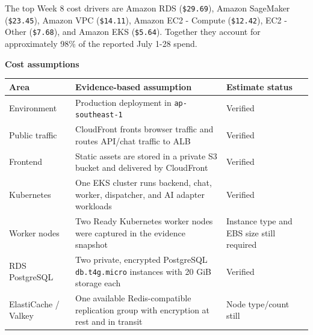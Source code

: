 The top Week 8 cost drivers are Amazon RDS (\texttt{\$29.\allowbreak{}69}), Amazon
SageMaker (\texttt{\$23.\allowbreak{}45}), Amazon VPC (\texttt{\$14.\allowbreak{}11}), Amazon EC2
- Compute (\texttt{\$12.\allowbreak{}42}), EC2 - Other (\texttt{\$7.\allowbreak{}68}), and Amazon
EKS (\texttt{\$5.\allowbreak{}64}). Together they account for approximately 98\% of
the reported July 1-28 spend.

\vspace{0.5em}\noindent\textbf{Cost assumptions}\par

{
\begingroup
\small
\setlength{\tabcolsep}{3pt}
\renewcommand{\arraystretch}{1.15}
\begin{longtable}{@{}
  >{\raggedright\arraybackslash}p{}
  >{\raggedright\arraybackslash}p{}
  >{\raggedright\arraybackslash}p{}@{}}
\toprule\noalign{}
\begin{minipage}[b]{\linewidth}\raggedright
Area
\end{minipage} & \begin{minipage}[b]{\linewidth}\raggedright
Evidence-based assumption
\end{minipage} & \begin{minipage}[b]{\linewidth}\raggedright
Estimate status
\end{minipage} \\
\midrule\noalign{}
\endhead
\bottomrule\noalign{}
\endlastfoot
Environment & Production deployment in \texttt{ap-\allowbreak{}southeast-\allowbreak{}1} &
Verified \\
Public traffic & CloudFront fronts browser traffic and routes API/chat
traffic to ALB & Verified \\
Frontend & Static assets are stored in a private S3 bucket and delivered
by CloudFront & Verified \\
Kubernetes & One EKS cluster runs backend, chat, worker, dispatcher, and
AI adapter workloads & Verified \\
Worker nodes & Two Ready Kubernetes worker nodes were captured in the
evidence snapshot & Instance type and EBS size still required \\
RDS PostgreSQL & Two private, encrypted PostgreSQL \texttt{db.\allowbreak{}t4g.\allowbreak{}micro}
instances with 20 GiB storage each & Verified \\
ElastiCache / Valkey & One available Redis-compatible replication group
with encryption at rest and in transit & Node type/count still

\end{longtable}}
